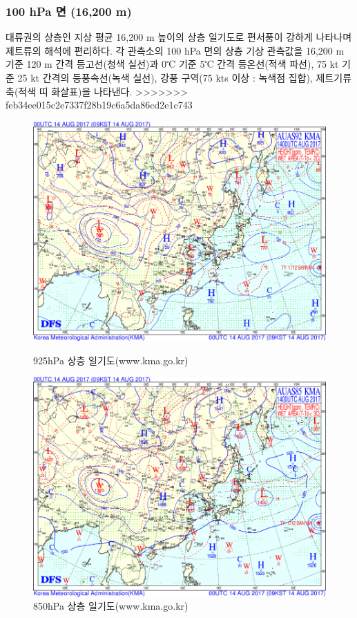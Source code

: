 \subsubsection{100 hPa 면 (16,200 m)}
대류권의 상층인 지상 평균 16,200 m 높이의 상층 일기도로 편서풍이 강하게 나타나며 제트류의 해석에 편리하다. 각 관측소의 100 hPa 면의 상층 기상 관측값을 16,200 m 기준 120 m 간격 등고선(청색 실선)과 0℃ 기준 5℃ 간격 등온선(적색 파선), 75 kt 기준 25 kt 간격의 등풍속선(녹색 실선), 강풍 구역(75 kts 이상 :  녹색점 집합), 제트기류 축(적색 띠 화살표)을 나타낸다. 
>>>>>>> feb34ee015c2e7337f28b19c6a5da86cd2e1c743

\begin{figure}[p]\centering
	\begin{minipage}{0.97\textwidth}
	\includegraphics[width=0.97\linewidth]{22Weather_forecasting/images/up92_2017081400}
		\caption{925hPa 상층 일기도(www.kma.go.kr)}
		\label{fig:draw-weathermapsurf92}
	\end{minipage}
	\begin{minipage}{0.97\textwidth}
	\includegraphics[width=0.97\linewidth]{22Weather_forecasting/images/up85_2017081400}
		\caption{850hPa 상층 일기도(www.kma.go.kr)}
		\label{fig:draw-weathermapsurf85}
	\end{minipage}
\end{figure}

